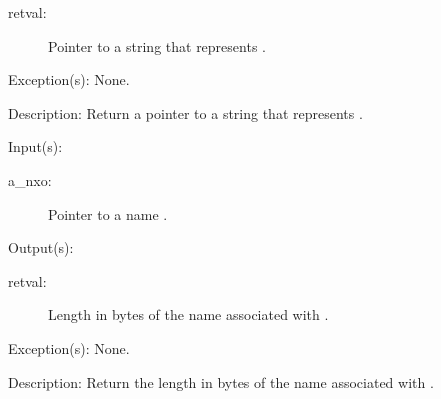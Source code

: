 \begin{capi}
\begin{capilist}
\begin{description}
		\item[retval: ]
			Pointer to a string that represents .
		\end{description}
	\item[Exception(s): ] None.
	\item[Description: ]
		Return a pointer to a string that represents .
	\end{capilist}
\label{nxo_name_len_get}
	\begin{capilist}
	\item[Input(s): ]
		\begin{description}\item[]
		\item[a\_nxo: ]
			Pointer to a name .
		\end{description}
	\item[Output(s): ]
		\begin{description}\item[]
		\item[retval: ]
			Length in bytes of the name associated with
			.
		\end{description}
	\item[Exception(s): ] None.
	\item[Description: ]
		Return the length in bytes of the name associated with
		.
	\end{capilist}
\end{capi}
